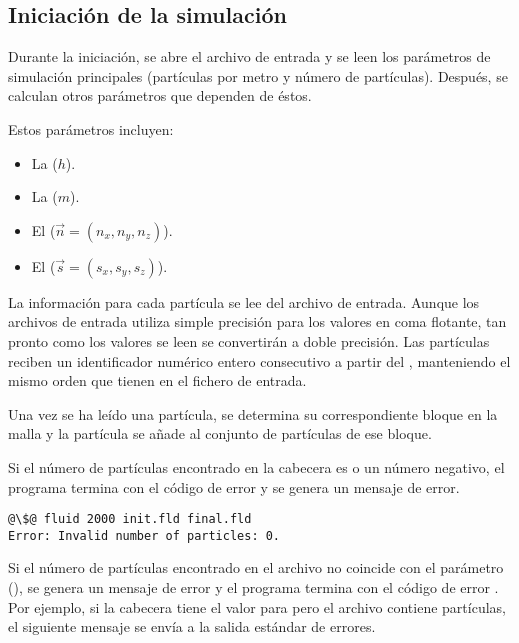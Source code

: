 \subsection{Iniciación de la simulación}

Durante la iniciación, se abre el archivo de entrada y se leen los parámetros de
simulación principales (partículas por metro y número de partículas).
Después, se calculan otros parámetros que dependen de éstos.

Estos parámetros incluyen:
\begin{itemize}
\item La  ($h$).
\item La  ($m$).
\item El  ($\vec{n} = (n_x, n_y, n_z)$).
\item El  ($\vec{s} = (s_x, s_y, s_z)$).
\end{itemize}

La información para cada partícula se lee del archivo de entrada. Aunque los
archivos de entrada utiliza simple precisión para los valores en coma flotante,
tan pronto como los valores se leen se convertirán a doble precisión. Las
partículas reciben un identificador numérico entero consecutivo a partir del 
, manteniendo el mismo orden que tienen en el fichero de entrada.

Una vez se ha leído una partícula, se determina su correspondiente bloque en la
malla y la partícula se añade al conjunto de partículas de ese bloque.

Si el número de partículas encontrado en la cabecera es  o un número
negativo, el programa termina con el código de error  y se genera un
mensaje de error.

\begin{lstlisting}[style=terminal,escapechar=@]
@\$@ fluid 2000 init.fld final.fld
Error: Invalid number of particles: 0.
\end{lstlisting}

Si el número de partículas encontrado en el archivo no coincide con el parámetro
 (), se genera un mensaje de error y
el programa termina con el código de error
. Por ejemplo, si la cabecera tiene el valor  para
 pero el archivo contiene  partículas, el siguiente mensaje se
envía a la salida estándar de errores.

